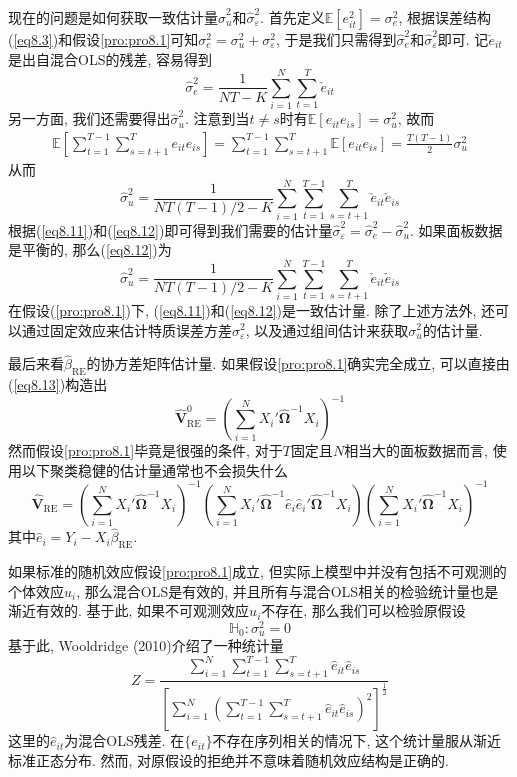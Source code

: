 \documentclass[cn, 12pt, math=mtpro2, bibstyle=apa, blue, twocol]{elegantbook}
\newcommand{\E}{\mathbb{E}}
\newcommand{\hb}{\hat{\beta}}
\newcommand{\HH}{\mathbb{H}}
\newcommand{\V}{\mathbold{V}}
\newcommand{\BO}{\mathbold{\Omega}}
\begin{document}
现在的问题是如何获取一致估计量$\hat{\sigma}_u^2$和$\hat{\sigma}_\varepsilon^2$. 首先定义$\E[e_{it}^2]=\sigma_e^2$, 根据误差结构(\ref{eq8.3})和假设\ref{pro:pro8.1}可知$\sigma^2_e=\sigma_u^2+\sigma_\varepsilon^2$, 于是我们只需得到$\hat{\sigma}_e^2$和$\hat{\sigma}_\varepsilon^2$即可. 记$\check{e}_{it}$是出自混合OLS的残差, 容易得到
\begin{equation}\label{eq8.11}
  \hat{\sigma}_e^2=\frac{1}{NT-K}\sum_{i=1}^{N}\sum_{t=1}^T\check{e}_{it}
\end{equation}
另一方面, 我们还需要得出$\hat{\sigma}_u^2$. 注意到当$t\neq s$时有$\E[e_{it}e_{is}]=\sigma_u^2$, 故而
\begin{align*}
\E\left[\sum_{t=1}^{T-1}\sum_{s=t+1}^{T} e_{it}e_{is}\right]=\sum_{t=1}^{T-1}\sum_{s=t+1}^{T}\E[e_{it}e_{is}]=\frac{T(T-1)}{2}\sigma_u^2
\end{align*}
从而
\begin{equation}\label{eq8.12}
  \hat{\sigma}_u^2=\frac{1}{NT(T-1)/2-K}\sum_{i=1}^{N}\sum_{t=1}^{T-1}\sum_{s=t+1}^{T}\check{e}_{it}\check{e}_{is}
\end{equation}
根据(\ref{eq8.11})和(\ref{eq8.12})即可得到我们需要的估计量$\hat{\sigma}_\varepsilon^2=\hat{\sigma}_e^2-\hat{\sigma}_u^2$. 如果面板数据是平衡的, 那么(\ref{eq8.12})为
$$\hat{\sigma}_u^2=\frac{1}{NT(T-1)/2-K}\sum_{i=1}^{N}\sum_{t=1}^{T-1}\sum_{s=t+1}^{T}\check{e}_{it}\check{e}_{is}$$
在假设(\ref{pro:pro8.1})下, (\ref{eq8.11})和(\ref{eq8.12})是一致估计量. 除了上述方法外, 还可以通过固定效应来估计特质误差方差$\sigma_\varepsilon^2$, 以及通过组间估计来获取$\sigma_u^2$的估计量.

最后来看$\hb_{\text{RE}}$的协方差矩阵估计量. 如果假设\ref{pro:pro8.1}确实完全成立, 可以直接由(\ref{eq8.13})构造出
$$\hat{\V}_{\text{RE}}^0=\left(\sum_{i=1}^{N}X_i'\hat{\BO}^{-1}X_i\right)^{-1}$$
然而假设\ref{pro:pro8.1}毕竟是很强的条件, 对于$T$固定且$N$相当大的面板数据而言, 使用以下聚类稳健的估计量通常也不会损失什么
$$\hat{\V}_{\text{RE}}=\left(\sum_{i=1}^{N}X_i'\hat{\BO}^{-1}X_i\right)^{-1}\left(\sum_{i=1}^{N}X_i'\hat{\BO}^{-1}\hat{e}_i\hat{e}_i'\hat{\BO}^{-1}X_i\right)\left(\sum_{i=1}^{N}X_i'\hat{\BO}^{-1}X_i\right)^{-1}$$
其中$\hat{e}_i=Y_i-X_i\hat{\beta}_{\text{RE}}$.

如果标准的随机效应假设\ref{pro:pro8.1}成立, 但实际上模型中并没有包括不可观测的个体效应$u_i$, 那么混合OLS是有效的, 并且所有与混合OLS相关的检验统计量也是渐近有效的. 基于此, 如果不可观测效应$u_i$不存在, 那么我们可以检验原假设
$$\HH_0: \sigma_u^2=0$$
基于此, Wooldridge (2010)介绍了一种统计量
$$Z=\frac{\displaystyle\sum_{i=1}^{N}\sum_{t=1}^{T-1}\sum_{s=t+1}^{T}\hat{e}_{it}\hat{e}_{is}}{\displaystyle\left[\sum_{i=1}^{N}\left(\sum_{t=1}^{T-1}\sum_{s=t+1}^{T}\hat{e}_{it}\hat{e}_{is}\right)^2\right]^{\frac{1}{2}}}$$
这里的$\hat{e}_{it}$为混合OLS残差. 在$\{e_{it}\}$不存在序列相关的情况下, 这个统计量服从渐近标准正态分布. 然而, 对原假设的拒绝并不意味着随机效应结构是正确的.
\end{document}
